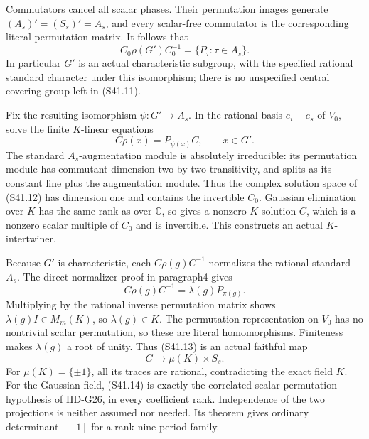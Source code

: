 Commutators cancel all scalar phases. Their permutation images
generate \((A_s)'=(S_s)'=A_s\), and every scalar-free
commutator is the corresponding literal permutation matrix.
It follows that
\[
          C_0\rho(G')C_0^{-1}=\{P_\tau:\tau\in A_s\}.
                                                               \tag{S41.11}
\]
In particular \(G'\) is an actual characteristic subgroup,
with the specified rational standard character under this
isomorphism; there is no unspecified central covering group
left in (S41.11).

Fix the resulting isomorphism \(\psi:G'\to A_s\).
In the rational basis \(e_i-e_s\) of \(V_0\), solve
the finite \(K\)-linear equations
\[
                 C\rho(x)=P_{\psi(x)}C,
                                      \qquad x\in G'.       \tag{S41.12}
\]
The standard \(A_s\)-augmentation module is absolutely
irreducible: its permutation module has commutant dimension
two by two-transitivity, and splits as its constant line plus
the augmentation module. Thus the complex solution space of
(S41.12) has dimension one and contains the invertible
\(C_0\). Gaussian elimination over \(K\) has the same
rank as over \(\mathbb C\), so gives a nonzero \(K\)-solution
\(C\), which is a nonzero scalar multiple of \(C_0\) and
is invertible. This constructs an actual \(K\)-intertwiner.

Because \(G'\) is characteristic, each \(C\rho(g)C^{-1}\)
normalizes the rational standard \(A_s\). The direct
normalizer proof in paragraph4 gives
\[
               C\rho(g)C^{-1}=\lambda(g)P_{\pi(g)}.
                                                               \tag{S41.13}
\]
Multiplying by the rational inverse permutation matrix shows
\(\lambda(g)I\in M_m(K)\), so \(\lambda(g)\in K\).
The permutation representation on \(V_0\) has no nontrivial
scalar permutation, so these are literal homomorphisms. Finiteness
makes \(\lambda(g)\) a root of unity. Thus (S41.13) is an
actual faithful map
\[
                        G\longrightarrow\mu(K)\times S_s.
                                                               \tag{S41.14}
\]
For \(\mu(K)=\{\pm1\}\), all its traces are rational,
contradicting the exact field \(K\). For the Gaussian field,
(S41.14) is exactly the correlated scalar-permutation hypothesis
of HD-G26, in every coefficient rank. Independence of the two
projections is neither assumed nor needed. Its theorem gives
ordinary determinant \([-1]\) for a rank-nine period family.

